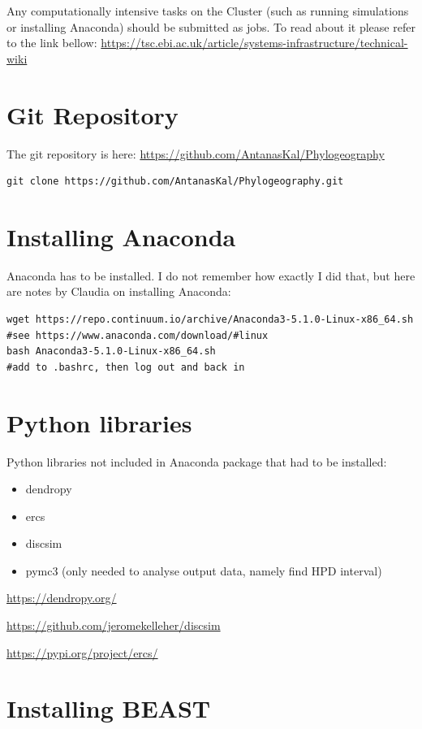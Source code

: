 Any computationally intensive tasks on the Cluster (such as running simulations or installing Anaconda) should be submitted as jobs. To read about it please refer to the link bellow:
\url{https://tsc.ebi.ac.uk/article/systems-infrastructure/technical-wiki}
\section*{Git Repository}

The git repository is here: \url{https://github.com/AntanasKal/Phylogeography}

\begin{verbatim}
git clone https://github.com/AntanasKal/Phylogeography.git
\end{verbatim}

\section*{Installing Anaconda}

Anaconda has to be installed. I do not remember how exactly I did that, but here are notes by Claudia on installing Anaconda:

\begin{verbatim}
wget https://repo.continuum.io/archive/Anaconda3-5.1.0-Linux-x86_64.sh
#see https://www.anaconda.com/download/#linux
bash Anaconda3-5.1.0-Linux-x86_64.sh
#add to .bashrc, then log out and back in
\end{verbatim}

\section*{Python libraries}

Python libraries not included in Anaconda package that had to be installed:

\begin{itemize}
\item dendropy
\item ercs
\item discsim
\item pymc3 (only needed to analyse output data, namely find HPD interval)
\end{itemize}

\url{https://dendropy.org/}

\url{https://github.com/jeromekelleher/discsim}

\url{https://pypi.org/project/ercs/}

\section*{Installing BEAST}

